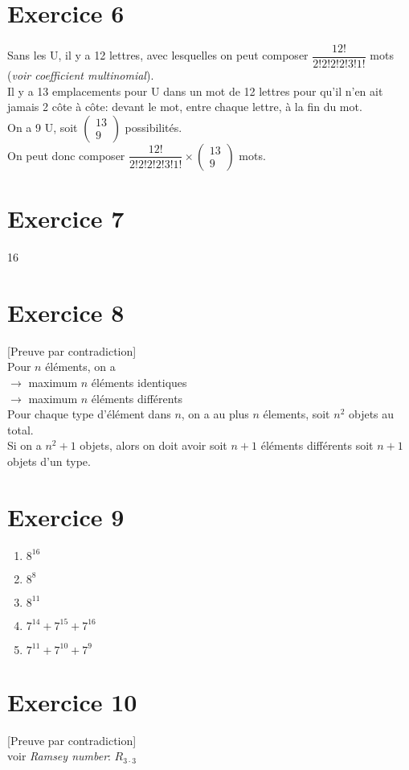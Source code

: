\documentclass[fontsize=10pt]{article}
\begin{document}
\section*{Exercice 6}
Sans les U, il y a 12 lettres, avec lesquelles on peut composer $\dfrac{12!}{2!2!2!2!3!1!}$ mots (\textit{voir coefficient multinomial}).\\
Il y a 13 emplacements pour U dans un mot de 12 lettres pour qu'il n'en ait jamais 2 côte à côte: devant le mot, entre chaque lettre, à la fin du mot.\\
On a 9 U, soit $\begin{pmatrix}
13\\
9
\end{pmatrix}$ possibilités.\\
On peut donc composer $\dfrac{12!}{2!2!2!2!3!1!} \times \begin{pmatrix}
13\\
9
\end{pmatrix}$ mots.


\section*{Exercice 7}
16
\section*{Exercice 8}
[Preuve par contradiction]\\
Pour $n$ éléments, on a \\
$\rightarrow$ maximum $n$ éléments identiques\\
$\rightarrow$ maximum $n$ éléments différents\\
Pour chaque type d'élément dans $n$, on a au plus $n$ élements, soit $n^2$ objets au total.\\
Si on a $n^2+1$ objets, alors on doit avoir soit $n+1$ éléments différents soit $n+1$ objets d'un type.
\section*{Exercice 9}
\begin{enumerate}
\item $8^{16}$
\item $8^8$
\item $8^{11}$
\item $7^{14}+7^{15}+7^{16}$
\item $7^{11}+7^{10}+7^{9}$
\end{enumerate}
\section*{Exercice 10}
[Preuve par contradiction]\\
voir \textit{Ramsey number}: $R_{3\cdot3}$\\
\end{document}
